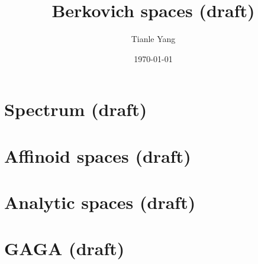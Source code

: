 \documentclass[sectionlevel=chapter]{noteformyself}
\title{Berkovich spaces (draft)}
\author{Tianle Yang}
\date{\today}
\begin{document}
    \maketitle

    \tableofcontents

    \section{Spectrum (draft)}
    
    \section{Affinoid spaces (draft)}
    
    \section{Analytic spaces (draft)}
    
    \section{GAGA (draft)}
    

    \printbibliography[heading=bibintoc, title={References}]
    
\end{document}
